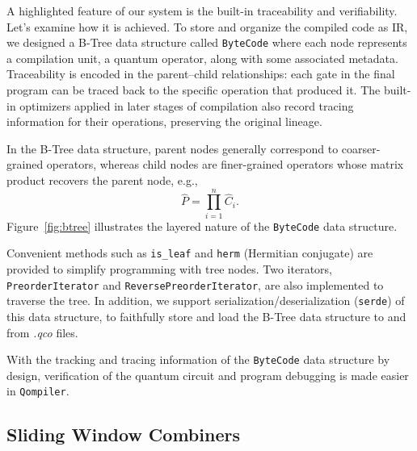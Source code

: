 \documentclass[a4paper,titlepage]{article}
\begin{document}
    A highlighted feature of our system is the built-in traceability and verifiability.
    Let's examine how it is achieved.
    To store and organize the compiled code as IR, we designed a B-Tree data structure called \texttt{ByteCode}
    where each node represents a compilation unit, a quantum operator, along with some associated metadata.
    Traceability is encoded in the parent--child relationships:
    each gate in the final program can be traced back to the specific operation that produced it.
    The built-in optimizers applied in later stages of compilation also record tracing information for their operations,
    preserving the original lineage.


    In the B-Tree data structure, parent nodes generally correspond to coarser-grained operators,
    whereas child nodes are finer-grained operators whose matrix product recovers the parent node, e.g.,
    \begin{equation}
        \label{eq:parent-child-relation}
        \hat{P} = \prod_{i=1}^{n} \hat{C}_{i}.
    \end{equation}
    Figure~\ref{fig:btree} illustrates the layered nature of the \texttt{ByteCode} data structure.


    Convenient methods such as \texttt{is\_leaf} and \texttt{herm} (Hermitian conjugate) are provided
    to simplify programming with tree nodes.
    Two iterators, \texttt{PreorderIterator} and \texttt{ReversePreorderIterator}, are also implemented
    to traverse the tree.
    In addition, we support serialization/deserialization (\texttt{serde}) of this data structure,
    to faithfully store and load the B-Tree data structure to and from \textit{.qco} files.

    With the tracking and tracing information of the \texttt{ByteCode} data structure by design, verification of the quantum circuit
    and program debugging is made easier in \texttt{Qompiler}.

    \subsection{Sliding Window Combiners}\label{subsec:optimization}
\end{document}

